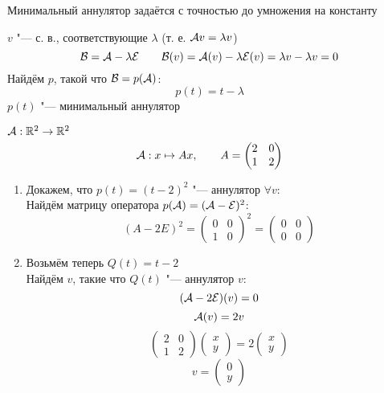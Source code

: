 \begin{remark}
	Минимальный аннулятор задаётся с точностью до умножения на константу
\end{remark}

\begin{exmpls}
	\item $ v $ "--- с. в., соответствующие $ \lambda $ (т. е. $ \mathcal{A}v = \lambda v $)
	$$ \mathcal{B} = \mathcal{A} - \lambda\mathcal{E} \qquad \mathcal{B}(v) = \mathcal{A}(v) - \lambda \mathcal{E}(v) = \lambda v - \lambda v = 0 $$
	Найдём $ p $, такой что $ \mathcal{B} = p(\mathcal{A}) $:
	$$ p(t) = t - \lambda $$
	$ p(t) $ "--- минимальный аннулятор
	\item $ \mathcal{A} : \mathbb{R}^2 \to \mathbb{R}^2 $
	$$ \mathcal{A} : x \mapsto Ax, \qquad A =
	\begin{pmatrix}
		2 & 0 \\
		1 & 2
	\end{pmatrix} $$
	\begin{enumerate}
		\item Докажем, что $ p(t) = (t - 2)^2 $ "--- аннулятор $ \forall v $: \\
		Найдём матрицу оператора $ p(\mathcal{A}) = (\mathcal{A} - \mathcal{E})^2 $:
		$$ (A - 2E)^2 =
		\begin{pmatrix}
			0 & 0 \\
			1 & 0
		\end{pmatrix}^2 =
		\begin{pmatrix}
			0 & 0 \\
			0 & 0
		\end{pmatrix} $$
		\item Возьмём теперь $ Q(t) = t - 2 $ \\
		Найдём $ v $, такие что $ Q(t) $ "--- аннулятор $ v $:
		$$ (\mathcal{A} - 2\mathcal{E})(v) = 0 $$
		$$ \mathcal{A}(v) = 2v $$
		$$
		\begin{pmatrix}
			2 & 0 \\
			1 & 2
		\end{pmatrix}
		\begin{pmatrix}
			x \\
			y
		\end{pmatrix} = 2
		\begin{pmatrix}
			x \\
			y
		\end{pmatrix} $$
		$$ v =
		\begin{pmatrix}
			0 \\
			y
		\end{pmatrix} $$
	\end{enumerate}
\end{exmpls}


